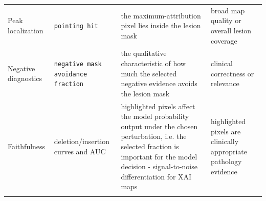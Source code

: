 \begin{longtable}[]{@{}llll@{}}
\begin{minipage}[t]{0.22\columnwidth}
		Peak localization\strut
	\end{minipage} & \begin{minipage}[t]{0.22\columnwidth}\raggedright
		\texttt{pointing \allowbreak hit}\strut
	\end{minipage} & \begin{minipage}[t]{0.22\columnwidth}\raggedright
		the maximum-attribution pixel lies inside the lesion mask\strut
	\end{minipage} & \begin{minipage}[t]{0.22\columnwidth}\raggedright
		broad map quality or overall lesion coverage\strut
	\end{minipage}\tabularnewline
	\begin{minipage}[t]{0.22\columnwidth}\raggedright
		Negative diagnostics\strut
	\end{minipage} & \begin{minipage}[t]{0.22\columnwidth}\raggedright
		\texttt{negative \allowbreak mask \allowbreak avoidance \allowbreak fraction}\strut
	\end{minipage} & \begin{minipage}[t]{0.22\columnwidth}\raggedright
		the qualitative characteristic of how much the selected negative 
		evidence avoids the lesion mask\strut
	\end{minipage} & \begin{minipage}[t]{0.22\columnwidth}\raggedright
		clinical correctness or relevance\strut
	\end{minipage}\tabularnewline
	\begin{minipage}[t]{0.22\columnwidth}\raggedright
		Faithfulness\strut
	\end{minipage} & \begin{minipage}[t]{0.22\columnwidth}\raggedright
		deletion/insertion curves and AUC\strut
	\end{minipage} & \begin{minipage}[t]{0.22\columnwidth}\raggedright
		highlighted pixels affect the model probability output under the chosen
		perturbation, i.e. the selected fraction is important for the model
		decision - signal-to-noise differentiation for XAI maps\strut
	\end{minipage} & \begin{minipage}[t]{0.22\columnwidth}\raggedright
		highlighted pixels are clinically appropriate pathology evidence\strut
	\end{minipage}\tabularnewline
	\begin{minipage}[t]{0.22\columnwidth}\raggedright

\end{minipage}
\end{longtable}
